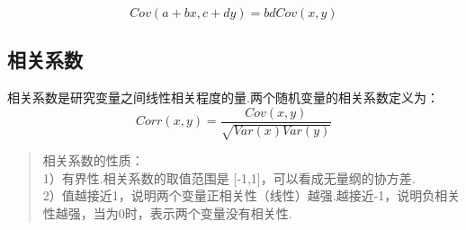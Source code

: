 \[
Cov(a+bx, c+dy) = bdCov(x, y)
\]

\subsection{ 相关系数}\label{ux76f8ux5173ux7cfbux6570}

相关系数是研究变量之间线性相关程度的量.两个随机变量的相关系数定义为：
\[
Corr(x,y) = \frac{Cov(x,y)}{\sqrt{Var(x)Var(y)}}
\]

\begin{quote}
相关系数的性质：\\
1）有界性.相关系数的取值范围是 {[}-1,1{]}，可以看成无量纲的协方差.\\
2）值越接近1，说明两个变量正相关性（线性）越强.越接近-1，说明负相关性越强，当为0时，表示两个变量没有相关性.
\end{quote}






